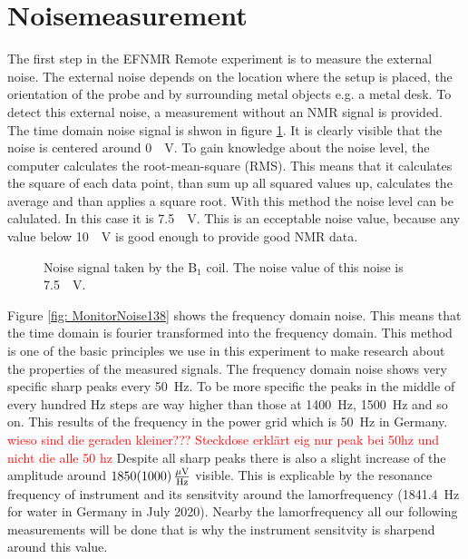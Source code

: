 \section{Noisemeasurement}
The first step in the EFNMR Remote experiment is to measure the external noise. The external noise depends on the location where the setup is placed, the orientation of the probe and by surrounding metal objects e.g. a metal desk. To detect this external noise, a measurement without an NMR signal is provided. The time domain noise signal is shwon in figure \ref{fig: noise}. It is clearly visible that the noise is centered around \SI{0}{\mu \volt}. To gain knowledge about the noise level, the computer calculates the root-mean-square (RMS). This means that it calculates the square of each data point, than sum up all squared values up, calculates the average and than applies a square root. With this method the noise level can be calulated. In this case it is \SI{7.5}{\mu \volt}. This is an ecceptable noise value, because any value below \SI{10}{\mu \volt} is good enough to provide good NMR data.

\begin{figure}[H]
    \centering
    
    \caption[Noise signal taken by the B$_1$ coil.]{Noise signal taken by the B$_1$ coil. The noise value of this noise is \SI{7.5}{\mu \volt}.}
    \label{fig: noise}
\end{figure}

Figure \ref{fig: MonitorNoise138} shows the frequency domain noise. This means that the time domain is fourier transformed into the frequency domain. This method is one of the basic principles we use in this experiment to make research about the properties of the measured signals. The frequency domain noise shows very specific sharp peaks every \SI{50}{\hertz}. To be more specific the peaks in the middle of every hundred \si{\hertz} steps are way higher than those at \SI{1400}{\hertz}, \SI{1500}{\hertz} and so on. This results of the frequency in the power grid which is \SI{50}{\hertz} in Germany.
\textcolor{red}{wieso sind die geraden kleiner??? Steckdose erklärt eig nur peak bei 50hz und nicht die alle 50 hz}
Despite all sharp peaks there is also a slight increase of the amplitude around $\SI{1850 \pm 1000}{\frac{\mu \volt}{\hertz}}$ visible. This is explicable by the resonance frequency of instrument and its sensitvity around the lamorfrequency (\SI{1841.4}{\hertz} for water in Germany in July 2020). Nearby the lamorfrequency all our following measurements will be done that is why the instrument sensitvity is sharpend around this value.


